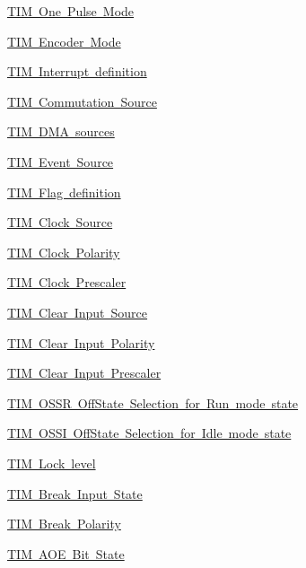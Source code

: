 \begin{DoxyCompactItemize}
\item 
\mbox{\hyperlink{group___t_i_m___one___pulse___mode}{T\+I\+M One Pulse Mode}}
\item 
\mbox{\hyperlink{group___t_i_m___encoder___mode}{T\+I\+M Encoder Mode}}
\item 
\mbox{\hyperlink{group___t_i_m___interrupt__definition}{T\+I\+M Interrupt definition}}
\item 
\mbox{\hyperlink{group___t_i_m___commutation___source}{T\+I\+M Commutation Source}}
\item 
\mbox{\hyperlink{group___t_i_m___d_m_a__sources}{T\+I\+M D\+M\+A sources}}
\item 
\mbox{\hyperlink{group___t_i_m___event___source}{T\+I\+M Event Source}}
\item 
\mbox{\hyperlink{group___t_i_m___flag__definition}{T\+I\+M Flag definition}}
\item 
\mbox{\hyperlink{group___t_i_m___clock___source}{T\+I\+M Clock Source}}
\item 
\mbox{\hyperlink{group___t_i_m___clock___polarity}{T\+I\+M Clock Polarity}}
\item 
\mbox{\hyperlink{group___t_i_m___clock___prescaler}{T\+I\+M Clock Prescaler}}
\item 
\mbox{\hyperlink{group___t_i_m___clear_input___source}{T\+I\+M Clear Input Source}}
\item 
\mbox{\hyperlink{group___t_i_m___clear_input___polarity}{T\+I\+M Clear Input Polarity}}
\item 
\mbox{\hyperlink{group___t_i_m___clear_input___prescaler}{T\+I\+M Clear Input Prescaler}}
\item 
\mbox{\hyperlink{group___t_i_m___o_s_s_r___off___state___selection__for___run__mode__state}{T\+I\+M O\+S\+S\+R Off\+State Selection for Run mode state}}
\item 
\mbox{\hyperlink{group___t_i_m___o_s_s_i___off___state___selection__for___idle__mode__state}{T\+I\+M O\+S\+S\+I Off\+State Selection for Idle mode state}}
\item 
\mbox{\hyperlink{group___t_i_m___lock__level}{T\+I\+M Lock level}}
\item 
\mbox{\hyperlink{group___t_i_m___break___input__enable__disable}{T\+I\+M Break Input State}}
\item 
\mbox{\hyperlink{group___t_i_m___break___polarity}{T\+I\+M Break Polarity}}
\item 
\mbox{\hyperlink{group___t_i_m___a_o_e___bit___set___reset}{T\+I\+M A\+O\+E Bit State}}
\item 

\end{DoxyCompactItemize}
